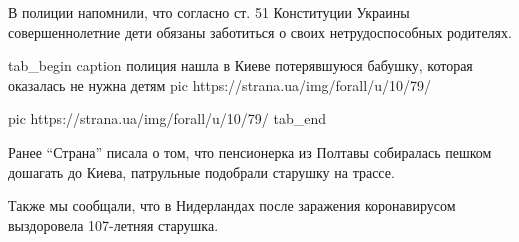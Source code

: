 В полиции напомнили, что согласно ст. 51 Конституции Украины совершеннолетние
дети обязаны заботиться о своих нетрудоспособных родителях.

\ifcmt
tab_begin
	caption полиция нашла в Киеве потерявшуюся бабушку, которая оказалась не нужна детям
	pic https://strana.ua/img/forall/u/10/79/%
	
	pic https://strana.ua/img/forall/u/10/79/%
tab_end
\fi

Ранее \enquote{Страна} писала о том, что пенсионерка из Полтавы собиралась пешком
дошагать до Киева, патрульные подобрали старушку на трассе.

Также мы сообщали, что в Нидерландах после заражения коронавирусом
выздоровела 107-летняя старушка.

